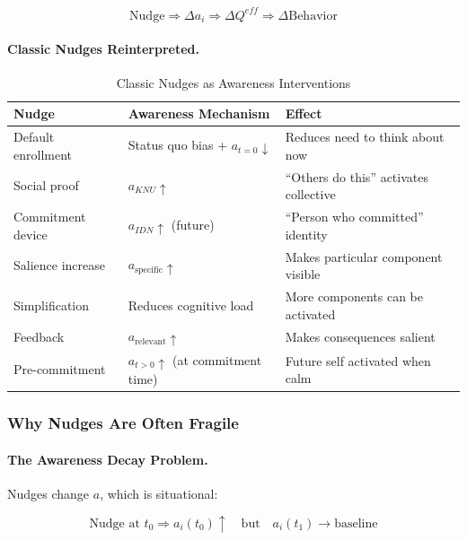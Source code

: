 \begin{equation}
\text{Nudge} \Rightarrow \Delta a_i \Rightarrow \Delta Q^{eff} \Rightarrow \Delta \text{Behavior}
\end{equation}

\paragraph{Classic Nudges Reinterpreted.}

\begin{table}[htbp]
\centering
\caption{Classic Nudges as Awareness Interventions}
\label{tab:nudges-awareness}
\renewcommand{\arraystretch}{1.3}
\begin{tabular}{@{}lll@{}}
\toprule
\textbf{Nudge} & \textbf{Awareness Mechanism} & \textbf{Effect} \\
\midrule
Default enrollment & Status quo bias + $a_{t=0} \downarrow$ & Reduces need to think about now \\
Social proof & $a_{KNU} \uparrow$ & ``Others do this'' activates collective \\
Commitment device & $a_{IDN} \uparrow$ (future) & ``Person who committed'' identity \\
Salience increase & $a_{\text{specific}} \uparrow$ & Makes particular component visible \\
Simplification & Reduces cognitive load & More components can be activated \\
Feedback & $a_{\text{relevant}} \uparrow$ & Makes consequences salient \\
Pre-commitment & $a_{t>0} \uparrow$ (at commitment time) & Future self activated when calm \\
\bottomrule
\end{tabular}
\end{table}

\subsubsection{Why Nudges Are Often Fragile}

\paragraph{The Awareness Decay Problem.}
Nudges change $a$, which is situational:

\begin{equation}
\text{Nudge at } t_0 \Rightarrow a_i(t_0) \uparrow \quad \text{but} \quad a_i(t_1) \rightarrow \text{baseline}
\end{equation}

